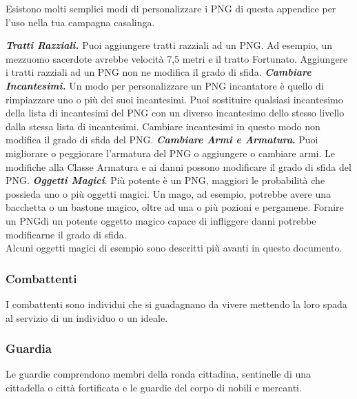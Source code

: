 \begin{multicols}{2}
Esistono molti semplici modi di personalizzare i PNG di questa appendice per l'uso nella tua campagna casalinga.

\emph{\textbf{Tratti Razziali.}} Puoi aggiungere tratti razziali ad un PNG. Ad esempio, un mezzuomo sacerdote avrebbe velocità 7,5 metri e il tratto Fortunato. Aggiungere i tratti razziali ad un PNG non ne modifica il grado di sfida. \emph{\textbf{Cambiare Incantesimi.}} Un modo per personalizzare un PNG incantatore è quello di rimpiazzare uno o più dei suoi incantesimi. Puoi sostituire qualsiasi incantesimo della lista di incantesimi del PNG con un diverso incantesimo dello stesso livello dalla stessa lista di incantesimi. Cambiare incantesimi in questo modo non modifica il grado di sfida del PNG. \textbf{\emph{Cambiare Armi e Armatura}.} Puoi migliorare o peggiorare l'armatura del PNG o aggiungere o cambiare armi. Le modifiche alla Classe Armatura e ai danni possono modificare il grado di sfida del PNG. \emph{\textbf{Oggetti Magici}}. Più potente è un PNG, maggiori le probabilità che possieda uno o più oggetti magici. Un mago, ad esempio, potrebbe avere una bacchetta o un bastone magico, oltre ad una o più pozioni e pergamene. Fornire un PNGdi un potente oggetto  magico capace di infliggere danni potrebbe modificarne il grado di sfida.\\

Alcuni oggetti magici di esempio sono descritti più avanti in questo documento.\\

\subsubsection{Combattenti}

I combattenti sono individui che si guadagnano da vivere mettendo la loro spada al servizio di un individuo o un ideale.

\subsubsection{Guardia}

Le guardie comprendono membri della ronda cittadina, sentinelle di una cittadella o città fortificata e le guardie del corpo di nobili e mercanti.\\


\end{multicols}

